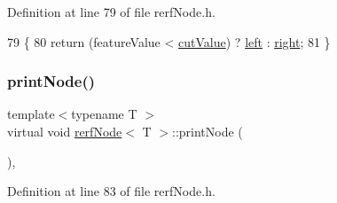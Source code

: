 Definition at line 79 of file rerf\+Node.\+h.


\begin{DoxyCode}
79                                            \{
80             \textcolor{keywordflow}{return} (featureValue < \hyperlink{classrerfNode_afbb93d044e16d18d7502e5d58fa345bf}{cutValue}) ? \hyperlink{classrerfNode_a0ffbd4e13914bfdd0d35e2e737b0a959}{left} : \hyperlink{classrerfNode_ae04521c833fe33f2b1cde19bb3cb615f}{right};
81         \}
\end{DoxyCode}
\mbox{\label{classrerfNode_afc097136492957d5cd96269addcfb413}} 
\subsubsection{\texorpdfstring{print\+Node()}{printNode()}}
{\footnotesize\ttfamily template$<$typename T $>$ \\
virtual void \hyperlink{classrerfNode}{rerf\+Node}$<$ T $>$\+::print\+Node (\begin{DoxyParamCaption}{ }\end{DoxyParamCaption})\hspace{0.3cm}{\ttfamily [inline]}, {\ttfamily [virtual]}}



Definition at line 83 of file rerf\+Node.\+h.


